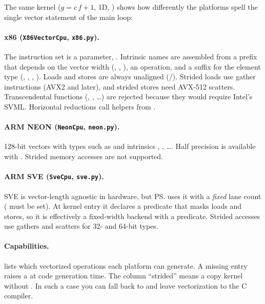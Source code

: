 The same kernel ($g = c\,f + 1$, 1D, ) shows how differently the
platforms spell the single vector statement of the main loop:

\paragraph{x86 (\texttt{X86VectorCpu}, \texttt{x86.py}).}
The instruction set is a parameter, .
Intrinsic names are assembled from a prefix that depends on the vector width
(, , ), an operation, and a suffix for the element
type (, , , ). Loads and stores are always
unaligned (/). Strided loads use gather instructions (AVX2 and
later), and strided stores need AVX-512 scatters. Transcendental functions (, ,
\dots) are rejected because they would require Intel's SVML. Horizontal reductions call
helpers from .

\paragraph{ARM NEON (\texttt{NeonCpu}, \texttt{neon.py}).}
128-bit vectors with types such as  and intrinsics ,
, \dots. Half precision is available with . Strided
memory accesses are not supported.

\paragraph{ARM SVE (\texttt{SveCpu}, \texttt{sve.py}).}
SVE is vector-length agnostic in hardware, but \ps{} uses it with a \emph{fixed} lane
count ( must be set). At kernel entry it declares a predicate
 that masks loads and stores, so it is effectively a
fixed-width backend with a predicate. Strided accesses use gathers and scatters for
32- and 64-bit types.

\paragraph{Capabilities.}
 lists which vectorized operations each platform can generate. A
missing entry raises a  at code generation time. The
column ``strided'' means a copy kernel without . In such a
case you can fall back to  and leave vectorization to the C compiler.

